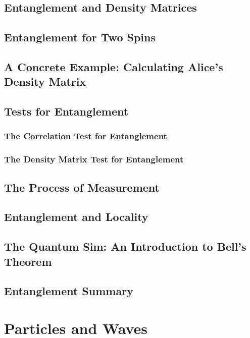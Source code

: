 \documentclass[a4paper]{article}
\begin{document}
\subsection{Entanglement and Density Matrices}
\subsection{Entanglement for Two Spins}



\subsection{A Concrete Example: Calculating Alice's Density Matrix}


\subsection{Tests for Entanglement}
\subsubsection{The Correlation Test for Entanglement}

\subsubsection{The Density Matrix Test for Entanglement}
\subsection{The Process of Measurement}

\subsection{Entanglement and Locality}
\subsection{The Quantum Sim: An Introduction to Bell's Theorem}
\subsection{Entanglement Summary}
%
%
\section{Particles and Waves}
\end{document}
